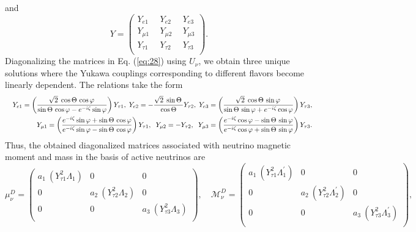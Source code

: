 \documentclass[aps, a4paper,superscriptaddress,12pt,preprintnumbers,floatfix,nofootinbib,amsmath,amssymb]{revtex4}
\begin{document}
and
\begin{equation}
Y = \left(\begin{array}{ccc}
Y_{e1} ~&~ Y_{e2} ~&~ Y_{e3} \\
Y_{\mu 1} ~&~ Y_{\mu 2} ~&~ Y_{\mu 3}\\
Y_{\tau 1} ~&~ Y_{\tau 2} ~&~ Y_{\tau 3}\\
\end{array}\right).
\end{equation}
Diagonalizing the matrices in Eq. (\ref{eq:28}) using $U_{\nu}$, we obtain three unique solutions where the Yukawa couplings corresponding to different flavors become linearly dependent. The relations take the form
\begin{eqnarray}  
&& Y_{e1} = \left(\frac{\sqrt2\;\cos \Theta\,\cos \varphi\,}
{\sin \Theta\,\cos \varphi-e^{-i\zeta}\sin \varphi}\right)Y_{\tau 1}, \hspace{0.1 cm}
Y_{e2} = -\frac{\sqrt2\;\sin \Theta\,}{\cos \Theta} Y_{\tau 2}, \hspace{0.1 cm}
Y_{e3} =
\left(\frac{\sqrt2\;\cos \Theta\,\sin \varphi\,}{\sin \Theta\,\sin \varphi+e^{-i\zeta}\cos \varphi}\right)Y_{\tau 3},
\nonumber \\ 
&& Y_{\mu1} = \left(\frac{e^{-i\zeta}\sin \varphi+\sin \Theta\,\cos \varphi}
{e^{-i\zeta}\sin \varphi-\sin \Theta\,\cos \varphi}\right)Y_{\tau 1}, \hspace{0.2 cm}
Y_{\mu2} = -Y_{\tau 2}, \hspace{0.2 cm}
Y_{\mu3} = \left(\frac{e^{-i\zeta}\cos \varphi-\sin \Theta\,\sin \varphi}
{e^{-i\zeta}\cos \varphi+\sin \Theta\,\sin \varphi}\right)Y_{\tau 3}.
\end{eqnarray}
Thus, the obtained diagonalized matrices associated with neutrino magnetic moment and mass in the basis of active neutrinos are  \cite{Kashiwase:2013uy,Ho:2013hia, Singirala:2016kam}
\begin{equation}
\mu^D_\nu=\left(\begin{array}{ccc}
a_1~ (Y^2_{\tau 1} \Lambda_1) & 0 & 0\\
0 & a_2~ (Y^2_{\tau 2} \Lambda_2) & 0\\
 0 & 0 & a_3 ~(Y^2_{\tau 3} \Lambda_3)\\
\end{array}\right),\quad
\mathcal{M}^D_\nu=\left(\begin{array}{ccc}
a_1~ (Y^2_{\tau 1} \Lambda^\prime_1) & 0 & 0\\
0 & a_2~ (Y^2_{\tau 2} \Lambda^\prime_2) & 0\\
 0 & 0 & a_3 ~(Y^2_{\tau 3} \Lambda^\prime_3)\\
\end{array}\right), 
\label{diagmat}
\end{equation}
\end{document}
